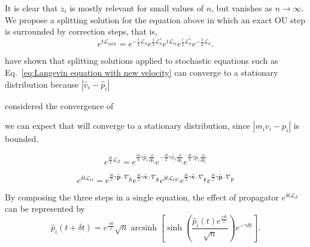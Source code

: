 \documentclass[
aip,
jcp,
reprint,
]{revtex4-1}
\DeclareMathOperator\arcsinh{arcsinh}
\newcommand{\vt}[1]{\boldsymbol{\mathbf{#1}}}          %
\newcommand{\diff}[2]{\frac{\partial #2}{\partial #1}} %
\newcommand{\Liu}{\mathcal{L}}
\newcommand{\nn}{n}
\begin{document}
It is clear that $z_i$ is mostly relevant for small values of $\nn$, but vanishes as $\nn \to \infty$.
We propose a splitting solution for the equation above in which an exact OU step is surrounded by correction steps, that is,
\begin{equation*}
e^{t \Liu_\mathrm{bath}} =
e^{-\frac{t}{2} \mathcal{L}_\mathrm{S}}
e^{\frac{t}{2} \mathcal{L}_\mathrm{S}^\ast}
e^{t \mathcal{L}_\mathrm{O}}
e^{\frac{t}{2} \mathcal{L}_\mathrm{S}^\ast}
e^{-\frac{t}{2} \mathcal{L}_\mathrm{S}}.
\end{equation*}

\citeauthor{Stoltz_2018} \cite{Stoltz_2018} have shown that splitting solutions applied to stochastic equations such as Eq.~\eqref{eq:Langevin equation with new velocity} can converge to a stationary distribution because $|\hat{v}_i - \hat{p}_i|$ 

\cite{Trstanova_2016}

considered the convergence of


we can expect that will converge to a stationary distribution, since $| m_i v_i - p_i |$ is bounded.


\begin{equation}
e^{\frac{\delta t}{2} \mathcal{L}_{Z}} =
e^{\frac{\delta t}{4} \gamma \hat{p}_i \diff{\hat{p}_i}{}}
e^{-\frac{\delta t}{2}  \gamma \hat{v}_i \diff{\hat{p}_i}{}}
e^{\frac{\delta t}{4} \gamma \hat{p}_i \diff{\hat{p}_i}{}}
\end{equation}

\begin{equation*}
e^{\delta t \mathcal{L}_\mathrm{O}} =
e^{\frac{\delta t}{2} \gamma \hat{\vt p} \cdot \nabla_{\hat{\vt p}}}
e^{\frac{\delta t}{2} \gamma \hat{\vt v} \cdot \nabla_{\hat{\vt p}}}
e^{\delta t \mathcal{L}_\mathrm{OU}}
e^{\frac{\delta t}{2} \gamma \hat{\vt v} \cdot \nabla_{\hat{\vt p}}}
e^{\frac{\delta t}{2} \gamma \hat{\vt p} \cdot \nabla_{\hat{\vt p}}}
\end{equation*}


By composing the three steps in a single equation, the effect of propagator $e^{\delta t \mathcal{L}_{Z}}$ can be represented by
\begin{equation*}
\hat{p}_i(t+\delta t) = e^{\frac{\gamma \delta t}{2}} \sqrt{\nn} \arcsinh\left[\sinh\left(\frac{\hat{p}_i(t) e^{\frac{\gamma \delta t}{2}}}{\sqrt{\nn}}\right) e^{-\gamma \delta t} \right].
\end{equation*}
\end{document}
